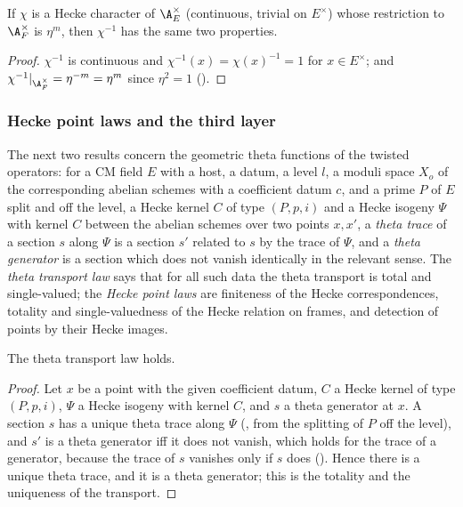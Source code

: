 \begin{lemma}\label{pf:stageU:heckeinv}
If $\chi$ is a Hecke character of $\A_E^\times$ (continuous, trivial on $E^\times$) whose restriction to $\A_F^\times$ is $\eta^m$, then
$\chi^{-1}$ has the same two properties.
\end{lemma}

\begin{proof}
$\chi^{-1}$ is continuous and $\chi^{-1}(x)=\chi(x)^{-1}=1$ for $x\in E^\times$; and $\chi^{-1}|_{\A_F^\times}=\eta^{-m}=\eta^m$ since $\eta^2=1$
().
\end{proof}

\subsubsection{Hecke point laws and the third layer}\label{sec:pf:stageU:points}

The next two results concern the geometric theta functions of the twisted operators: for a CM field $E$ with a host, a
datum, a level $l$, a moduli space $X_o$ of the corresponding abelian schemes with a coefficient datum $c$, and a prime $P$ of $E$
split and off the level, a Hecke kernel $C$ of type $(P,p,i)$ and a Hecke isogeny $\Psi$ with kernel $C$ between the abelian
schemes over two points $x,x'$, a \emph{theta trace} of a section $s$ along $\Psi$ is a section $s'$ related to $s$ by the trace
of $\Psi$, and a \emph{theta generator} is a section which does not vanish identically in the relevant sense. The \emph{theta
transport law} says that for all such data the theta transport is total and single-valued; the \emph{Hecke point laws} are
finiteness of the Hecke correspondences, totality and single-valuedness of the Hecke relation on frames, and detection of
points by their Hecke images.

\begin{lemma}\label{pf:stageU:transportlaw}
The theta transport law holds.
\end{lemma}

\begin{proof}
Let $x$ be a point with the given coefficient datum, $C$ a Hecke kernel of type $(P,p,i)$, $\Psi$ a Hecke isogeny with kernel $C$, and
$s$ a theta generator at $x$. A section $s$ has a unique theta trace along $\Psi$ (,
from the splitting of $P$ off the level), and $s'$ is a theta generator iff it does not vanish, which holds for the trace of a
generator, because the trace of $s$ vanishes only if $s$ does (). Hence there is
a unique theta trace, and it is a theta generator; this is the
totality and the uniqueness of the transport.
\end{proof}

